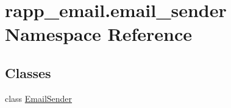 \hypertarget{namespacerapp__email_1_1email__sender}{\section{rapp\-\_\-email.\-email\-\_\-sender Namespace Reference}
\label{namespacerapp__email_1_1email__sender}
}
\subsection*{Classes}
\begin{DoxyCompactItemize}
\item 
class \hyperlink{classrapp__email_1_1email__sender_1_1EmailSender}{Email\-Sender}
\end{DoxyCompactItemize}
